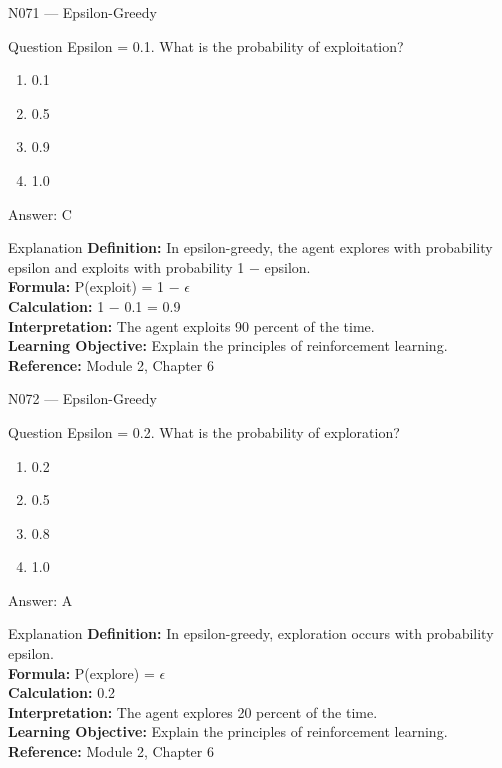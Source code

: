 \documentclass[aspectratio=169,8pt]{beamer}
\begin{document}
	\begin{frame}{N071 --- Epsilon-Greedy}
		\begin{block}{Question}
			Epsilon = 0.1. What is the probability of exploitation?
			\begin{enumerate}
				\item 0.1
				\item 0.5
				\item 0.9
				\item 1.0
			\end{enumerate}
		\end{block}
		\begin{exampleblock}{Answer: C}\end{exampleblock}
		\begin{block}{Explanation}
			\textbf{Definition:} In epsilon-greedy, the agent explores with probability epsilon and exploits with probability 1 $-$ epsilon.\\
			\textbf{Formula:} P(exploit) = 1 $-$ $\epsilon$\\
			\textbf{Calculation:} 1 $-$ 0.1 = 0.9\\
			\textbf{Interpretation:} The agent exploits 90 percent of the time.\\
			\textbf{Learning Objective:} Explain the principles of reinforcement learning.\\
			\textbf{Reference:} Module 2, Chapter 6
		\end{block}
	\end{frame}
	
	\begin{frame}{N072 --- Epsilon-Greedy}
		\begin{block}{Question}
			Epsilon = 0.2. What is the probability of exploration?
			\begin{enumerate}
				\item 0.2
				\item 0.5
				\item 0.8
				\item 1.0
			\end{enumerate}
		\end{block}
		\begin{exampleblock}{Answer: A}\end{exampleblock}
		\begin{block}{Explanation}
			\textbf{Definition:} In epsilon-greedy, exploration occurs with probability epsilon.\\
			\textbf{Formula:} P(explore) = $\epsilon$\\
			\textbf{Calculation:} 0.2\\
			\textbf{Interpretation:} The agent explores 20 percent of the time.\\
			\textbf{Learning Objective:} Explain the principles of reinforcement learning.\\
			\textbf{Reference:} Module 2, Chapter 6
		\end{block}
	\end{frame}
	
\end{document}
